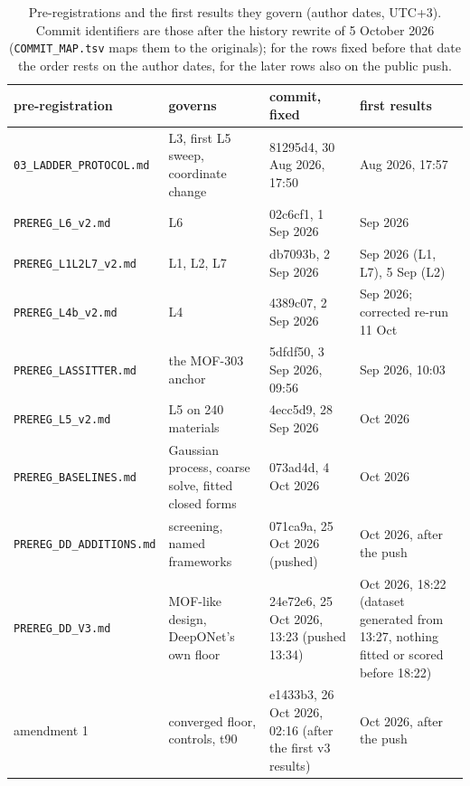 \begin{table}[!htbp]
\centering
\caption{Pre-registrations and the first results they govern (author dates, UTC+3). Commit identifiers are those after the history rewrite of 5 October 2026 (\texttt{COMMIT\_MAP.tsv} maps them to the originals); for the rows fixed before that date the order rests on the author dates, for the later rows also on the public push.}
\label{s2:tab:prereg}
\small
\begin{tabular}{@{}>{\raggedright\arraybackslash}p{4.6cm}>{\raggedright\arraybackslash}p{3.9cm}
                >{\raggedright\arraybackslash}p{2.7cm}>{\raggedright\arraybackslash}p{3.0cm}@{}}
\toprule
pre-registration & governs & commit, fixed & first results \\
\midrule
\texttt{03\_LADDER\_PROTOCOL.md} & L3, first L5 sweep, coordinate change & 81295d4, 30 Aug 2026, 17:50 & 30 Aug 2026, 17:57 \\
\texttt{PREREG\_L6\_v2.md} & L6 & 02c6cf1, 1 Sep 2026 & 2 Sep 2026 \\
\texttt{PREREG\_L1L2L7\_v2.md} & L1, L2, L7 & db7093b, 2 Sep 2026 & 3 Sep 2026 (L1, L7), 5 Sep (L2) \\
\texttt{PREREG\_L4b\_v2.md} & L4 & 4389c07, 2 Sep 2026 & 24 Sep 2026; corrected re-run 11 Oct \\
\texttt{PREREG\_LASSITTER.md} & the MOF-303 anchor & 5dfdf50, 3 Sep 2026, 09:56 & 3 Sep 2026, 10:03 \\
\texttt{PREREG\_L5\_v2.md} & L5 on 240 materials & 4ecc5d9, 28 Sep 2026 & 4 Oct 2026 \\
\texttt{PREREG\_BASELINES.md} & Gaussian process, coarse solve, fitted closed forms & 073ad4d, 4 Oct 2026 & 11 Oct 2026 \\
\texttt{PREREG\_DD\_ADDITIONS.md} & screening, named frameworks & 071ca9a, 25 Oct 2026 (pushed) & 25 Oct 2026, after the push \\
\texttt{PREREG\_DD\_V3.md} & MOF-like design, DeepONet's own floor & 24e72e6, 25 Oct 2026, 13:23 (pushed 13:34) & 25 Oct 2026, 18:22 (dataset generated from 13:27, nothing fitted or scored before 18:22) \\
\quad amendment 1 & converged floor, controls, t90 & e1433b3, 26 Oct 2026, 02:16 (after the first v3 results) & 26 Oct 2026, after the push \\
\bottomrule
\end{tabular}
\end{table}

